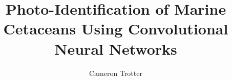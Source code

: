 \title{Photo-Identification of Marine Cetaceans Using Convolutional Neural Networks} 

\author{Cameron Trotter}



\renewcommand{\submissiontext}{In Partial Fulfilment of the Requirements for the Degree of}

 


\subject{Computer Vision}  
